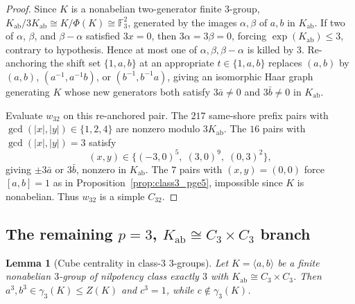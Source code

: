 \documentclass[11pt]{amsart}
\newtheorem{lemma}[theorem]{Lemma}
\theoremstyle{definition}
\theoremstyle{remark}
\newcommand{\F}{\mathbb{F}}
\begin{document}
\begin{proof}
Since $K$ is a nonabelian two-generator finite $3$-group, $K_{\mathrm{ab}}/3K_{\mathrm{ab}} \cong K/\Phi(K) \cong \F_3^2$, generated by the images $\alpha, \beta$ of $a, b$ in $K_{\mathrm{ab}}$. If two of $\alpha$, $\beta$, and $\beta - \alpha$ satisfied $3x = 0$, then $3\alpha = 3\beta = 0$, forcing $\exp(K_{\mathrm{ab}}) \le 3$, contrary to hypothesis. Hence at most one of $\alpha, \beta, \beta - \alpha$ is killed by $3$. Re-anchoring the shift set $\{1,a,b\}$ at an appropriate $t \in \{1,a,b\}$ replaces $(a,b)$ by $(a,b)$, $(a^{-1}, a^{-1}b)$, or $(b^{-1}, b^{-1}a)$, giving an isomorphic Haar graph generating $K$ whose new generators both satisfy $3\bar{a} \ne 0$ and $3\bar{b} \ne 0$ in $K_{\mathrm{ab}}$.

Evaluate $w_{32}$ on this re-anchored pair. The $217$ same-shore prefix pairs with $\gcd(|x|,|y|) \in \{1,2,4\}$ are nonzero modulo $3K_{\mathrm{ab}}$. The $16$ pairs with $\gcd(|x|,|y|) = 3$ satisfy
\[
(x,y) \in \{(-3,0)^5,\; (3,0)^9,\; (0,3)^2\},
\]
giving $\pm 3\bar{a}$ or $3\bar{b}$, nonzero in $K_{\mathrm{ab}}$. The $7$ pairs with $(x,y)=(0,0)$ force $[a,b]=1$ as in Proposition~\ref{prop:class3_pge5}, impossible since $K$ is nonabelian. Thus $w_{32}$ is a simple $C_{32}$.
\end{proof}

\subsection{The remaining $p = 3$, $K_{\mathrm{ab}} \cong C_3 \times C_3$ branch}

\begin{lemma}[Cube centrality in class-$3$ $3$-groups]\label{lem:p3_cubes}
Let $K = \langle a, b \rangle$ be a finite nonabelian $3$-group of nilpotency class exactly $3$ with $K_{\mathrm{ab}} \cong C_3 \times C_3$. Then $a^3, b^3 \in \gamma_3(K) \le Z(K)$ and $c^3 = 1$, while $c \notin \gamma_3(K)$.
\end{lemma}
\end{document}
